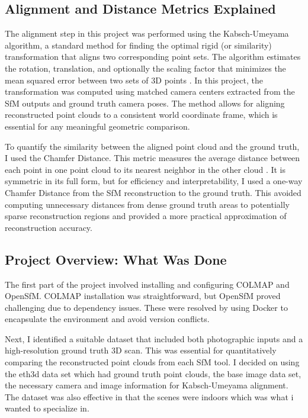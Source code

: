\documentclass[10pt,twocolumn]{article}
\begin{document}
\subsection{Alignment and Distance Metrics Explained}
The alignment step in this project was performed using the Kabsch-Umeyama algorithm, a standard method for finding the optimal rigid (or similarity) transformation that aligns two corresponding point sets. The algorithm estimates the rotation, translation, and optionally the scaling factor that minimizes the mean squared error between two sets of 3D points \cite{Lawrence_2019}. In this project, the transformation was computed using matched camera centers extracted from the SfM outputs and ground truth camera poses. The method allows for aligning reconstructed point clouds to a consistent world coordinate frame, which is essential for any meaningful geometric comparison.

To quantify the similarity between the aligned point cloud and the ground truth, I used the Chamfer Distance. This metric measures the average distance between each point in one point cloud to its nearest neighbor in the other cloud \cite{fan2016pointsetgenerationnetwork}. It is symmetric in its full form, but for efficiency and interpretability, I used a one-way Chamfer Distance from the SfM reconstruction to the ground truth. This avoided computing unnecessary distances from dense ground truth areas to potentially sparse reconstruction regions and provided a more practical approximation of reconstruction accuracy.


\subsection{Project Overview: What Was Done}
The first part of the project involved installing and configuring COLMAP and OpenSfM. COLMAP installation was straightforward, but OpenSfM proved challenging due to dependency issues. These were resolved by using Docker to encapsulate the environment and avoid version conflicts.

Next, I identified a suitable dataset that included both photographic inputs and a high-resolution ground truth 3D scan. This was essential for quantitatively comparing the reconstructed point clouds from each SfM tool. I decided on using the eth3d data set which had ground truth point clouds, the base image data set, the necessary camera and image information for Kabsch-Umeyama alignment. The dataset was also effective in that the scenes were indoors which was what i wanted to specialize in.
\end{document}
